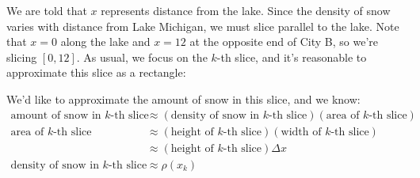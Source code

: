 \documentclass{article}
\begin{document}
\begin{enumerate}
\begin{enumerate}
    \begin{solution}      
      We are told that $x$ represents distance from the lake.  Since the
      density of snow varies with distance from Lake Michigan, we must
      slice parallel to the lake.  Note that $x = 0$ along the lake and $x
      = 12$ at the opposite end of City B, so we're slicing $[0, 12]$.  As
      usual, we focus on the $k$-th slice, and it's reasonable to
      approximate this slice as a rectangle:
      \begin{center}
      \end{center}
      We'd like to approximate the amount of snow in this slice, and we
      know:
      \begin{align*}
        \text{amount of snow in $k$-th slice} & \approx (\text{density of
          snow in $k$-th slice}) (\text{area of $k$-th slice}) \\
        \text{area of $k$-th slice} & \approx (\text{height of $k$-th
          slice})(\text{width of $k$-th slice}) \\
        & \approx (\text{height of $k$-th slice}) \Delta x \\
        \text{density of snow in $k$-th slice} & \approx \rho(x_k)

\end{align*}
\end{solution}
\end{enumerate}
\end{enumerate}
\end{document}
